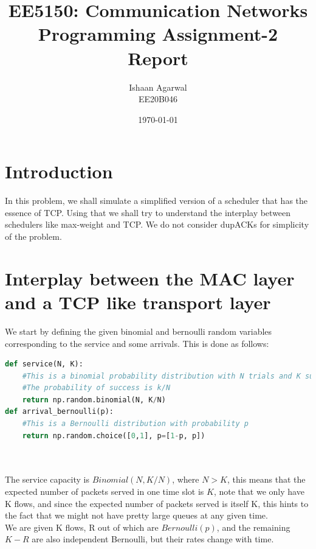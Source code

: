 \documentclass[11pt, a4paper]{article}
\title{EE5150: Communication Networks \\ Programming Assignment-2 Report} %
\author{Ishaan Agarwal \\ EE20B046} %
\date{\today} %
\begin{document}
		
		
\maketitle %

\section{Introduction}
In this problem, we shall simulate a simplified version of a scheduler that has the essence of TCP. Using that we shall try to understand the interplay between schedulers like max-weight and TCP. We do not consider dupACKs for simplicity of the problem.


\section{Interplay between the MAC layer and a TCP like transport layer}
We start by defining the given binomial and bernoulli random variables corresponding to the service and some arrivals. This is done as follows:
\\

\begin{lstlisting}[language = Python]
def service(N, K):
    #This is a binomial probability distribution with N trials and K successes
    #The probability of success is k/N
    return np.random.binomial(N, K/N)
def arrival_bernoulli(p):
    #This is a Bernoulli distribution with probability p
    return np.random.choice([0,1], p=[1-p, p])
    
    
\end{lstlisting}

The service capacity is $Binomial(N,K/N)$, where $N>K$, this means that the expected number of packets served in one time slot is $K$, note that we only have K flows, and since the expected number of packets served is itself K, this hints to the fact that we might not have pretty large queues at any given time.\\
We are given K flows, R out of which are $Bernoulli(p)$, and the remaining $K-R$ are also independent Bernoulli, but their rates change with time.
\end{document}
